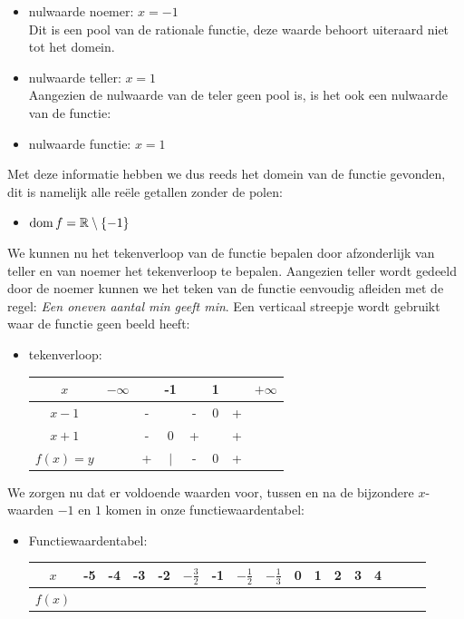 \documentclass[12pt]{article}
\begin{document}
\begin{itemize}
  \item nulwaarde noemer: $x=-1$\\
  Dit is een pool van de rationale functie, deze waarde behoort uiteraard niet tot het domein.
  \item nulwaarde teller: $x=1$\\
  Aangezien de nulwaarde van de teler geen pool is, is het ook een nulwaarde van de functie:
  \item nulwaarde functie: $x=1$\\  
\end{itemize}

Met deze informatie hebben we dus reeds het domein van de functie gevonden, dit is namelijk alle reële getallen zonder de polen:
\begin{itemize}
  \item $\dom f= \mathbb{R}\setminus \{-1\}$
\end{itemize}

We kunnen nu het tekenverloop van de functie bepalen door afzonderlijk van teller en van noemer het tekenverloop te bepalen. Aangezien teller wordt gedeeld door de noemer kunnen we het teken van de functie eenvoudig afleiden met de regel: {\em Een oneven aantal min geeft min}. Een verticaal streepje wordt gebruikt waar de functie geen beeld heeft:

\begin{itemize}
  \item tekenverloop:
  \begin{center}
    \begin{tabular}{c|ccccccc}
    $x$ & $-\infty$ & & -1 & & 1 & & $+\infty$\\   
    \hline
    $x-1$ & & - &   & - & 0 & + & \\
    $x+1$ & & - & 0 & + &   & + & \\
    \hline
    $f(x)=y$ & & + & $|$ & - & 0 & +
    \end{tabular}
  \end{center}
\end{itemize}

We zorgen nu dat er voldoende waarden voor, tussen en na de bijzondere $x$-waarden $-1$ en $1$ komen in onze functiewaardentabel:

\begin{itemize}
\item Functiewaardentabel:
\begin{center}
\hspace*{-2cm}
\begin{tabular}{c|cccccccccccccccc}
  $x$ & -5 & -4 & -3 & -2 & $-\frac{3}{2}$ & -1 & $-\frac{1}{2}$ & $-\frac{1}{3}$ & 0 & 1 & 2 & 3 & 4\\
  \hline
  $f(x)$\\
\end{tabular}
\end{center}
\end{itemize}
\end{document}
